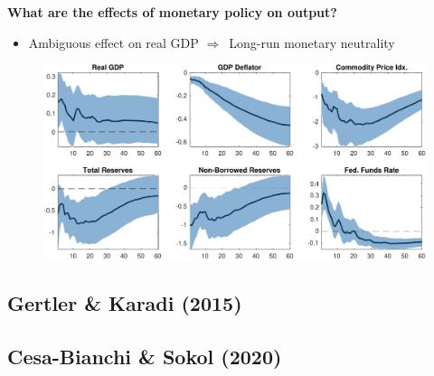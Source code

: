 \documentclass[10pt,english,t,aspectratio=169,ignorenonframetext]{beamer}
\begin{document}
\begin{frame}
{\textbf{What are the effects of monetary policy on output?}}

\begin{itemize}
\item Ambiguous effect on real GDP $\Longrightarrow $\ Long-run monetary
neutrality
\end{itemize}

\begin{figure}[h]
\vspace{.3cm}\includegraphics[width=.8\textwidth]{Uhlig_Replication.pdf}
\end{figure}
\end{frame}


\subsection{Gertler \& Karadi (2015)}

\begin{frame}
\vspace{3cm} \color{title}%
\bigskip

\color{note}
\end{frame}


\subsection{Cesa-Bianchi \& Sokol (2020)}

\begin{frame}
\vspace{3cm} \color{title}%
\bigskip

\color{note}
\end{frame}

\end{document}
